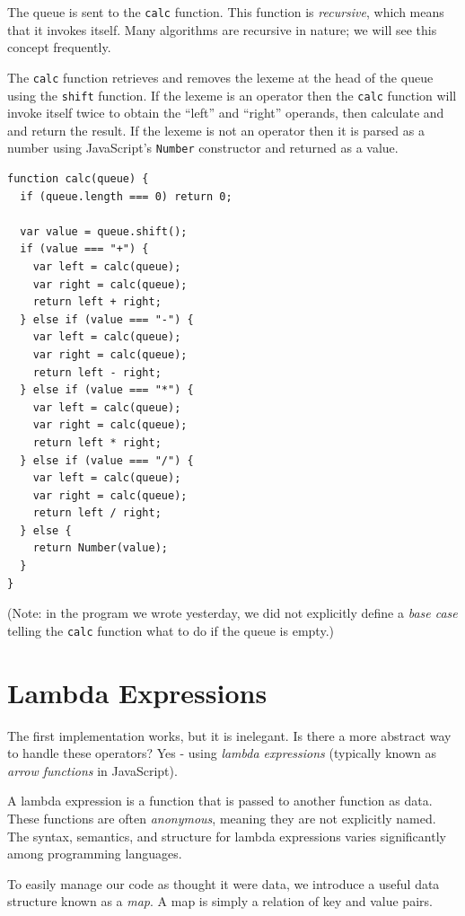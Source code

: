 \documentclass{book}
\begin{document}
The queue is sent to the \texttt{calc} function. This function is \textit{recursive}, which means that it invokes itself. Many algorithms are recursive in nature; we will see this concept frequently.

The \texttt{calc} function retrieves and removes the lexeme at the head of the queue using the \texttt{shift} function. If the lexeme is an operator then the \texttt{calc} function will invoke itself twice to obtain the ``left'' and ``right'' operands, then calculate and and return the result. If the lexeme is not an operator then it is parsed as a number using JavaScript's \texttt{Number} constructor and returned as a value.

\begin{lstlisting}
function calc(queue) {
  if (queue.length === 0) return 0;

  var value = queue.shift();
  if (value === "+") {
    var left = calc(queue);
    var right = calc(queue);
    return left + right;
  } else if (value === "-") {
    var left = calc(queue);
    var right = calc(queue);
    return left - right;
  } else if (value === "*") {
    var left = calc(queue);
    var right = calc(queue);
    return left * right;
  } else if (value === "/") {
    var left = calc(queue);
    var right = calc(queue);
    return left / right;
  } else {
    return Number(value);
  }
}
\end{lstlisting}

(Note: in the program we wrote yesterday, we did not explicitly define a \textit{base case} telling the \texttt{calc} function what to do if the queue is empty.)

\section{Lambda Expressions}
The first implementation works, but it is inelegant. Is there a more abstract way to handle these operators? Yes - using \textit{lambda expressions} (typically known as \textit{arrow functions} in JavaScript).

A lambda expression is a function that is passed to another function as data. These functions are often \textit{anonymous}, meaning they are not explicitly named. The syntax, semantics, and structure for lambda expressions varies significantly among programming languages.

To easily manage our code as thought it were data, we introduce a useful data structure known as a \textit{map}. A map is simply a relation of key and value pairs.
\end{document}

